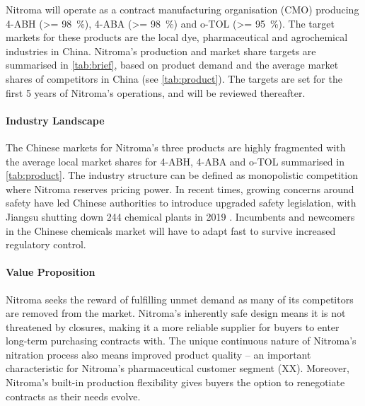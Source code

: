 Nitroma will operate as a contract manufacturing organisation (CMO) producing 4-ABH (\SI{>= 98}{\percent}), 4-ABA (\SI{>= 98}{\percent}) and o-TOL (\SI{>= 95}{\percent}). The target markets for these products are the local dye, pharmaceutical and agrochemical industries in China. Nitroma’s production and market share targets are summarised in \cref{tab:brief}, based on product demand and the average market shares of competitors in China (see \cref{tab:product}). The targets are set for the first 5 years of Nitroma’s operations, and will be reviewed thereafter.


\paragraph{Industry Landscape}
The Chinese markets for Nitroma’s three products are highly fragmented with the average local market shares for 4-ABH, 4-ABA and o-TOL summarised in \cref{tab:product}. The industry structure can be defined as monopolistic competition where Nitroma reserves pricing power. In recent times, growing concerns around safety have led Chinese authorities to introduce upgraded safety legislation, with Jiangsu shutting down 244 chemical plants in 2019 \cite{kielburger_chinese_2019}. Incumbents and newcomers in the Chinese chemicals market will have to adapt fast to survive increased regulatory control.


\paragraph{Value Proposition}
Nitroma seeks the reward of fulfilling unmet demand as many of its competitors are removed from the market. Nitroma’s inherently safe design means it is not threatened by closures, making it a more reliable supplier for buyers to enter long-term purchasing contracts with. The unique continuous nature of Nitroma’s nitration process also means improved product quality – an important characteristic for Nitroma’s pharmaceutical customer segment (XX). Moreover, Nitroma’s built-in production flexibility gives buyers the option to renegotiate contracts as their needs evolve. %

